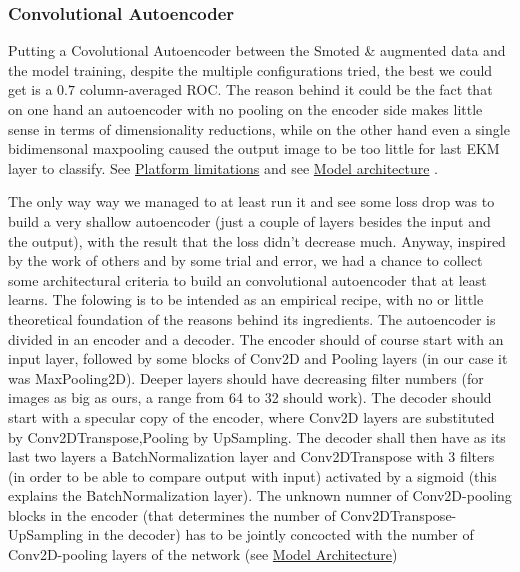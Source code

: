 \documentclass[]{article}
\begin{document}
\hypertarget{ae}{%
\subsubsection{Convolutional Autoencoder}\label{ae}}

Putting a Covolutional Autoencoder between the Smoted \& augmented data
and the model training, despite the multiple configurations tried, the
best we could get is a \(0.7\) column-averaged ROC. The reason behind it
could be the fact that on one hand an autoencoder with no pooling on the
encoder side makes little sense in terms of dimensionality reductions,
while on the other hand even a single bidimensonal maxpooling caused the
output image to be too little for last EKM layer to classify. See
\protect\hyperlink{limitations}{Platform limitations} and see
\protect\hyperlink{model-architecture}{Model architecture} .

The only way way we managed to at least run it and see some loss drop
was to build a very shallow autoencoder (just a couple of layers besides
the input and the output), with the result that the loss didn't decrease
much. Anyway, inspired by the work of others and by some trial and
error, we had a chance to collect some architectural criteria to build
an convolutional autoencoder that at least learns. The folowing is to be
intended as an empirical recipe, with no or little theoretical
foundation of the reasons behind its ingredients. The autoencoder is
divided in an encoder and a decoder. The encoder should of course start
with an input layer, followed by some blocks of Conv2D and Pooling
layers (in our case it was MaxPooling2D). Deeper layers should have
decreasing filter numbers (for images as big as ours, a range from 64 to
32 should work). The decoder should start with a specular copy of the
encoder, where Conv2D layers are substituted by Conv2DTranspose,Pooling
by UpSampling. The decoder shall then have as its last two layers a
BatchNormalization layer and Conv2DTranspose with 3 filters (in order to
be able to compare output with input) activated by a sigmoid (this
explains the BatchNormalization layer). The unknown numner of
Conv2D-pooling blocks in the encoder (that determines the number of
Conv2DTranspose-UpSampling in the decoder) has to be jointly concocted
with the number of Conv2D-pooling layers of the network (see
\protect\hyperlink{model-architecture}{Model Architecture})
\end{document}

